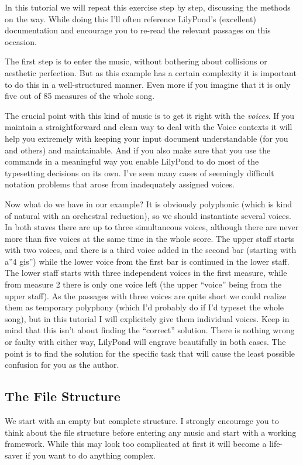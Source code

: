 \documentclass[../LilyPond-Tutorials]{subfiles}
\begin{document}
In this tutorial we will repeat this exercise step by step, discussing the methods on the way. 
While doing this I'll often reference LilyPond's (excellent) documentation and encourage you to re-read the relevant passages on this occasion.

The first step is to enter the music, without bothering about collisions or aesthetic perfection. 
But as this example has a certain complexity it is important to do this in a well-structured manner. 
Even more if you imagine that it is only five out of 85 measures of the whole song.

The crucial point with this kind of music is to get it right with the \emph{voices}. 
If you maintain a straightforward and clean way to deal with the Voice contexts  it will help you extremely with keeping your input document understandable (for you and others) and maintainable. 
And if you also make sure that you use the  commands  in a meaningful way you enable LilyPond to do most of the typesetting decisions on its own. I've seen many cases of seemingly difficult notation problems that arose from inadequately assigned voices.

Now what do we have in our example? 
It is obviously polyphonic (which is kind of natural with an orchestral reduction), so we should instantiate several voices. 
In both staves there are up to three simultaneous voices, although there are never more than five voices at the same time in the whole score. 
The upper staff starts with two voices, and there is a third voice added in the second bar (starting with a''4 gis'') while the lower voice from the first bar is continued in the lower staff. 
The lower staff starts with three independent voices in the first measure, while from measure 2 there is only one voice left (the upper “voice” being from the upper staff). 
As the passages with three voices are quite short we could realize them as temporary polyphony (which I'd probably do if I'd typeset the whole song), but in this tutorial I will explicitely give them individual voices. 
Keep in mind that this isn't about finding the “correct” solution. 
There is nothing wrong or faulty with either way, LilyPond will engrave beautifully in both cases. 
The point is to find the solution for the specific task that will cause the least possible confusion for you as the author.

\subsection{The File Structure}
We start with an empty but complete structure. 
I strongly encourage you to think about the file structure before entering any music and start with a working framework. 
While this may look too complicated at first it will become a life-saver if you want to do anything complex.
\end{document}
